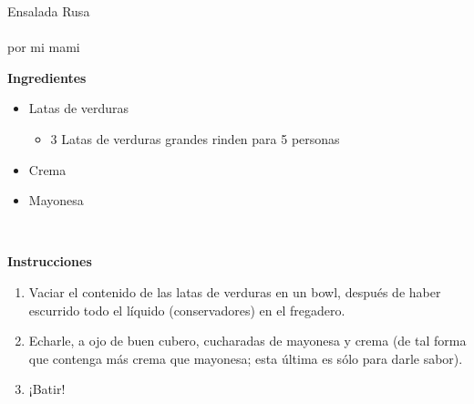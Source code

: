 \documentclass[letterpaper]{article}
\begin{document}
\begin{center}
{\Huge Ensalada Rusa}\\\\

por mi mami\\
\end{center}

\hrulefill
\begin{center}
\textbf{\Large Ingredientes}\\
\end{center}
\hrulefill


\begin{itemize}
\item Latas de verduras
	\begin{itemize}
		\item 3 Latas de verduras grandes rinden para 5 personas		
	\end{itemize}
\item Crema
\item Mayonesa\\
\end{itemize}

\hrulefill \\
\begin{center}
\textbf{\Large Instrucciones}
\end{center}
\hrulefill

\begin{enumerate}
\item Vaciar el contenido de las latas de verduras en un bowl, después de haber escurrido todo el líquido (conservadores) en el fregadero.
	
\item Echarle, a ojo de buen cubero, cucharadas de mayonesa y crema (de tal forma que contenga más crema que mayonesa; esta última es sólo para darle sabor).

\item ¡Batir!
\end{enumerate}
\end{document}
